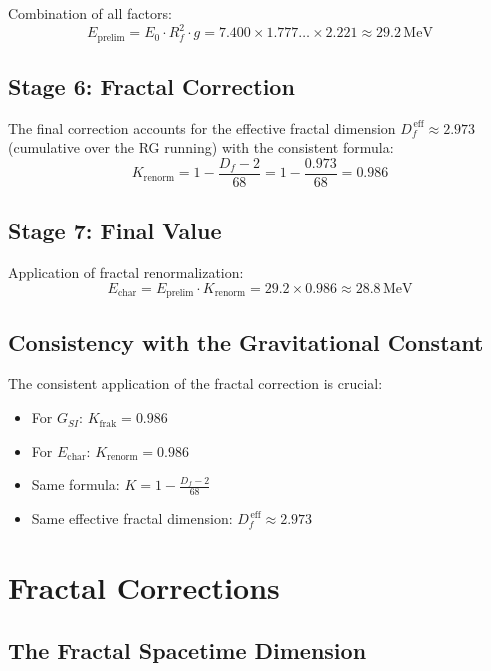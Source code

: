 	Combination of all factors:
	\begin{equation}
		E_{\text{prelim}} = E_0 \cdot R_f^2 \cdot g = 7.400 \times 1.777\ldots \times 2.221 \approx 29.2\,\text{MeV}
	\end{equation}
	
	\subsection{Stage 6: Fractal Correction}
	
	The final correction accounts for the effective fractal dimension $D_f^{\,\text{eff}} \approx 2.973$ (cumulative over the RG running) with the consistent formula:
	\begin{equation}
		K_{\text{renorm}} = 1 - \frac{D_f - 2}{68} = 1 - \frac{0.973}{68} = 0.986
	\end{equation}
	
	\subsection{Stage 7: Final Value}
	
	Application of fractal renormalization:
	\begin{equation}
		E_{\text{char}} = E_{\text{prelim}} \cdot K_{\text{renorm}} = 29.2 \times 0.986 \approx 28.8\,\text{MeV}
	\end{equation}
	
	\subsection{Consistency with the Gravitational Constant}
	
	The consistent application of the fractal correction is crucial:
	\begin{itemize}
		\item For $G_{SI}$: $K_{\text{frak}} = 0.986$
		\item For $E_{\text{char}}$: $K_{\text{renorm}} = 0.986$
		\item Same formula: $K = 1 - \frac{D_f - 2}{68}$
		\item Same effective fractal dimension: $D_f^{\,\text{eff}} \approx 2.973$
	\end{itemize}
	
	\section{Fractal Corrections}
	
	\subsection{The Fractal Spacetime Dimension}
	
